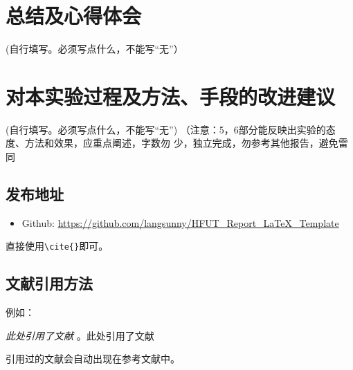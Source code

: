 \documentclass[12pt,hyperref,a4paper,twoside,UTF8]{ctexart}
\begin{document}
\section{总结及心得体会}

 (自行填写。必须写点什么，不能写“无”）
\section{对本实验过程及方法、手段的改进建议}


 (自行填写。必须写点什么，不能写“无”)
（注意：5，6部分能反映出实验的态度、方法和效果，应重点阐述，字数勿
少，独立完成，勿参考其他报告，避免雷同

\subsection{发布地址}
\begin{itemize}
    \item Github: \url{https://github.com/langsunny/HFUT_Report_LaTeX_Template}
\end{itemize}
直接使用\verb|\cite{}|即可\cite{DBLP:conf/nips/VaswaniSPUJGKP17}。
\subsection{文献引用方法}
例如：


   \textit{ 此处引用了文献}
   \cite{DBLP:conf/nips/VaswaniSPUJGKP17}。此处引用了文献\cite{DBLP:conf/nips/VaswaniSPUJGKP17}


引用过的文献会自动出现在参考文献中。


\end{document}
